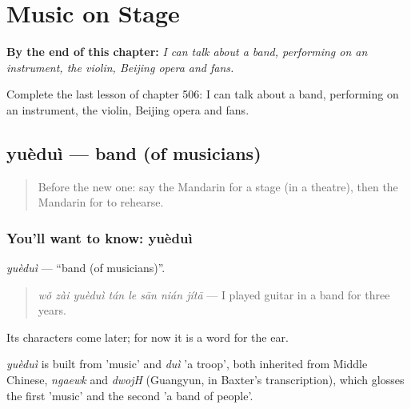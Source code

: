
\chapter{Music on Stage}
\label{ch:zh-music-on-stage}

\begin{chapteropening}
\textbf{By the end of this chapter:} \emph{I can talk about a band, performing on an instrument, the violin, Beijing opera and fans.}

Complete the last lesson of chapter 506: I can talk about a band, performing on an instrument, the violin, Beijing opera and fans.
\end{chapteropening}

\section[yuèduì]{yuèduì — band (of musicians)}

\label{lesson:ZH-C506-yuedui}



\begin{quote}
Before the new one: say the Mandarin for a stage (in a theatre), then the Mandarin for to rehearse.
\end{quote}

\subsection*{You'll want to know: yuèduì}
\emph{yuèduì} — \textquotedblleft{}band (of musicians)\textquotedblright{}.

\begin{quote}
\emph{wǒ zài yuèduì tán le sān nián jítā} — I played guitar in a band for three years.
\end{quote}

Its characters come later; for now it is a word for the ear.

\begin{cousinweb}
\emph{yuèduì} is built from  'music' and \emph{duì} 'a troop', both inherited from Middle Chinese, \emph{ngaewk} and \emph{dwojH} (Guangyun, in Baxter's transcription), which glosses the first 'music' and the second 'a band of people'.
\end{cousinweb}

